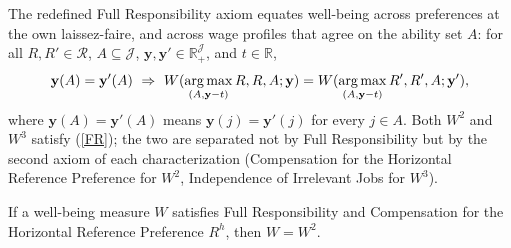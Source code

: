 The redefined Full Responsibility axiom equates well-being across preferences at
the own laissez-faire, and across wage profiles that agree on the ability set
$A$: for all $R,R'\in\mathcal R$, $A\subseteq\mathcal J$,
$\mathbf y,\mathbf y'\in\mathbb R_+^{\mathcal J}$, and $t\in\mathbb R$,
\begin{equation}
\mathbf y(A)=\mathbf y'(A)\ \Rightarrow\
W(\operatorname*{arg\,max}_{(A,\mathbf y-t)}R,R,A;\mathbf y)
=W(\operatorname*{arg\,max}_{(A,\mathbf y-t)}R',R',A;\mathbf y'),
\label{FR}
\end{equation}
where $\mathbf y(A)=\mathbf y'(A)$ means $\mathbf y(j)=\mathbf y'(j)$ for every
$j\in A$. Both $W^2$ and $W^3$ satisfy (\ref{FR}); the two are separated not by
Full Responsibility but by the second axiom of each characterization
(Compensation for the Horizontal Reference Preference for $W^2$, Independence of
Irrelevant Jobs for $W^3$).

\begin{theorem}
\label{thm:w2}
If a well-being measure $W$ satisfies Full Responsibility and Compensation for
the Horizontal Reference Preference $R^h$, then $W=W^2$.
\end{theorem}

